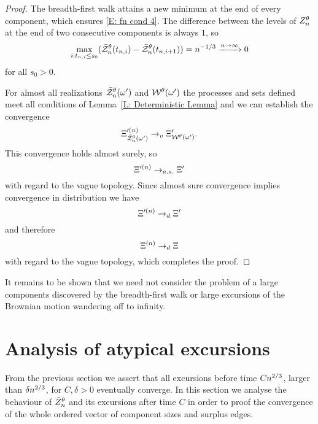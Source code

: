 \begin{proof}
	The breadth-first walk attains a new minimum at the end of every component,
	which ensures \eqref{E: fn cond 4}.
	The difference between the levels of $Z_n^{\theta}$ at the end of two consecutive components is always $1$,
	so 
	\begin{equation}
		\max_{i: t_{n, i} \leq s_0}(\bar{\mathcal{Z}}^{\theta}_n(t_{n, i}) - \bar{\mathcal{Z}}^{\theta}_n(t_{n, i+1})) = n^{-1 / 3} \xrightarrow{n \rightarrow \infty} 0
	\end{equation}
	for all $s_0 > 0$.
	
	
	For almost all realizations $\bar{\mathcal{Z}}^{\theta}_n(\omega')$ and $\mathcal{W}^{\theta}(\omega')$ 
	the processes and sets defined meet all conditions of Lemma~\ref{L: Deterministic Lemma}
	and we can establish the convergence
	\begin{equation}	
		\Xi^{\prime (n)}_{\bar{\mathcal{Z}}^{\theta}_n(\omega')} \rightarrow_v \Xi^{\prime}_{\mathcal{W}^{\theta}(\omega')}.
	\end{equation}
	This convergence holds almost surely, so
	\begin{equation}
		\Xi^{\prime (n)} \rightarrow_{a.s.} \Xi^{\prime}
	\end{equation}
	with regard to the vague topology.
	Since almost sure convergence implies convergence in distribution we have
	\begin{equation}
		\Xi^{\prime (n)} \rightarrow_d \Xi^{\prime}
	\end{equation}
	and therefore
	\begin{equation}
		\Xi^{(n)} \rightarrow_d \Xi
	\end{equation}
	with regard to the vague topology, which completes the proof.	
\end{proof}



It remains to be shown that we need not consider the problem of a large components discovered by the breadth-first walk
or large excursions of the Brownian motion wandering off to infinity.

\section{Analysis of atypical excursions} \label{S: late excursions}
From the previous section we assert that all excursions before time $Cn^{2 / 3}$, larger than $\delta n^{2 / 3}$, for $C, \delta > 0$
eventually converge.
In this section we analyse the behaviour of $\bar{Z}^{\theta}_n$ and its excursions after time $C$ in order to proof the convergence
of the whole ordered vector of component sizes and surplus edges.

